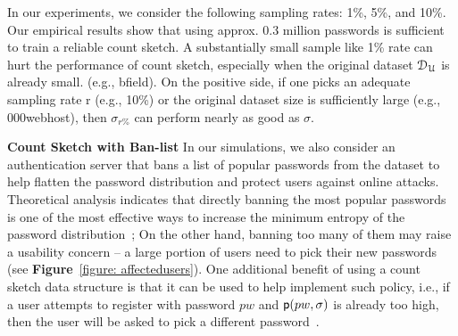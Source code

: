 
In our experiments, we consider the following sampling rates: 1\%, 5\%, and 10\%. Our empirical results show that using approx. 0.3 million passwords is sufficient to train a reliable count sketch. A substantially small sample like 1\% rate can hurt the performance of count sketch, especially when the original dataset $\mathcal{D}_{{\mathcal{U}}}$ is already small. (e.g., bfield). On the positive side, if one picks an adequate sampling rate r (e.g., 10\%) or the original dataset size is sufficiently large (e.g., 000webhost), then $\sigma_{r\%}$ can perform nearly as good as $\sigma$.





\textbf{Count Sketch with Ban-list} In our simulations, we also consider an authentication server that bans a list of popular passwords from the dataset to help flatten the password distribution and protect users against online attacks. Theoretical analysis indicates that directly banning the most popular passwords is one of the most effective ways to increase the minimum entropy of the password distribution~\cite{BKPS:ACMEC13}; On the other hand, banning too many of them may raise a usability concern – a large portion of users need to pick their new passwords (see \textbf{Figure}~\ref{figure: affectedusers}). One additional benefit of using a count sketch data structure is that it can be used to help implement such policy, i.e., if a user attempts to register with password $pw$ and $\textsf{p}(pw,\sigma)$ is already too high, then the user will be asked to pick a different password~\cite{HTS:SchHerMit10}.

